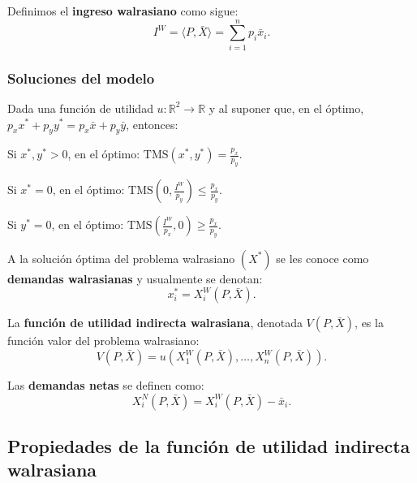 \documentclass[8pt,a4paper]{extarticle}
\begin{document}
\begin{multicols}{3}
	\begin{boxdef}
		Definimos el \textbf{ingreso walrasiano} como sigue:
		\[
			I^W = \langle P, \bar{X} \rangle = \sum_{i=1}^n p_i \bar{x}_i
			.\]
	\end{boxdef}

	\subsubsection*{Soluciones del modelo}

	Dada una función de utilidad $u : \mathbb{R}^2 \to \mathbb{R}$ y al suponer que, en el óptimo, $p_x x^* + p_y y^* = p_x \bar{x} + p_y \bar{y}$, entonces:

	\begin{bulletlist}
		\item Si $x^*, y^* > 0$, en el óptimo: $\displaystyle \text{TMS} (x^*, y^*) = \frac{p_x}{p_y}$.
		\item Si $x^* = 0$, en el óptimo: $\displaystyle \text{TMS} \left(0, \frac{I^W}{p_y}\right) \le \frac{p_x}{p_y}$.
		\item Si $y^* = 0$, en el óptimo: $\displaystyle \text{TMS} \left(\frac{I^W}{p_x}, 0\right) \ge \frac{p_x}{p_y}$.
	\end{bulletlist}

	\begin{boxdef}
		A la solución óptima del problema walrasiano $(X^*)$ se les conoce como \textbf{demandas walrasianas} y usualmente se denotan:
		\[
			x_i^* = X_i^W (P, \bar{X})
			.\]
	\end{boxdef}

	\begin{boxdef}
		La \textbf{función de utilidad indirecta walrasiana}, denotada $V(P, \bar{X})$, es la función valor del problema walrasiano:
		\[
			V(P, \bar{X}) = u(X_1^W(P, \bar{X}), \ldots, X_n^W(P, \bar{X}))
			.\]
	\end{boxdef}

	\begin{boxdef}
		Las \textbf{demandas netas} se definen como:
		\[
			X_i^N (P, \bar{X}) = X_i^W (P, \bar{X}) - \bar{x}_i
			.\]
	\end{boxdef}

	\sectionbreak

	\subsection{Propiedades de la función de utilidad indirecta walrasiana}


\end{multicols}
\end{document}
